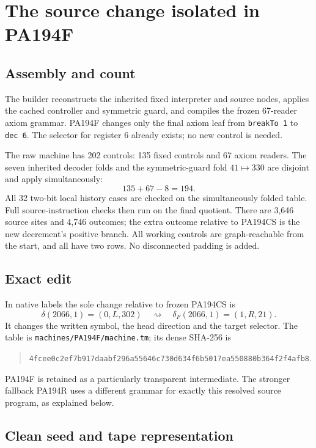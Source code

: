 \documentclass[11pt,letterpaper]{article}
\newcommand{\file}[1]{{\small\nolinkurl{#1}}}
\begin{document}
\section{The source change isolated in PA194F}
\label{sec:construction}

\subsection{Assembly and count}

The builder reconstructs the inherited fixed interpreter and source
nodes, applies the cached controller and symmetric guard, and compiles
the frozen 67-reader axiom grammar. PA194F changes only the final
axiom leaf from \file{breakTo 1} to \file{dec 6}. The selector for register
6 already exists; no new control is needed.

The raw machine has 202 controls: 135 fixed controls and 67 axiom
readers. The seven inherited decoder folds and the symmetric-guard
fold $41\mapsto330$ are disjoint and apply simultaneously:
\[
                         135+67-8=194.
\]
All 32 two-bit local history cases are checked on the simultaneously
folded table. Full source-instruction checks then run on the final
quotient. There are 3,646 source sites and 4,746 outcomes; the extra
outcome relative to PA194CS is the new decrement's positive branch.
All working controls are graph-reachable from the start, and all have
two rows. No disconnected padding is added.

\subsection{Exact edit}

In native labels the sole change relative to frozen PA194CS is
\[
 \delta(2066,1)=(0,L,302)
       \quad\rightsquigarrow\quad
 \delta_F(2066,1)=(1,R,21).
\]
It changes the written symbol, the head direction and the target
selector. The table is \file{machines/PA194F/machine.tm}; its dense
SHA-256 is
\begin{quote}\small\ttfamily
\nolinkurl{4fcee0c2ef7b917daabf296a55646c730d634f6b5017ea550880b364f2f4afb8}.
\end{quote}
PA194F is retained as a particularly transparent intermediate.
The stronger fallback PA194R uses a different grammar for exactly this
resolved source program, as explained below.

\subsection{Clean seed and tape representation}
\end{document}
